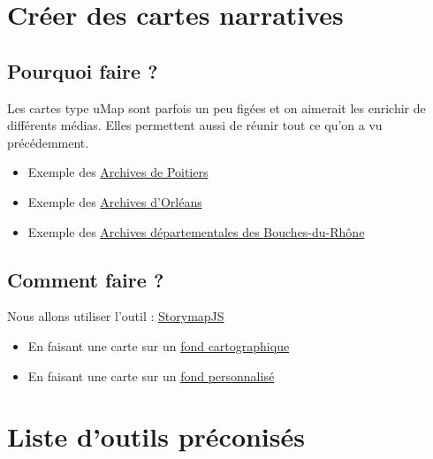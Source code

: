 \documentclass[
  letterpaper,
  DIV=11,
  numbers=noendperiod]{scrartcl}
\begin{document}
\section{Créer des cartes
narratives}\label{cruxe9er-des-cartes-narratives}

\subsection{Pourquoi faire ?}\label{pourquoi-faire-3}

Les cartes type uMap sont parfois un peu figées et on aimerait les
enrichir de différents médias. Elles permettent aussi de réunir tout ce
qu'on a vu précédemment.

\begin{itemize}
\item
  Exemple des
  \href{https://storymaps.arcgis.com/collections/9a11ba9ba4fa40389c188924aad51844?item=1}{Archives
  de Poitiers}
\item
  Exemple des
  \href{https://storymaps.arcgis.com/stories/e2cefbbcdb7d498289241459af733416}{Archives
  d'Orléans}
\item
  Exemple des
  \href{https://www.archives13.fr/n/l-exposition-coloniale-de-marseille-de/n:298}{Archives
  départementales des Bouches-du-Rhône}
\end{itemize}

\subsection{Comment faire ?}\label{comment-faire-4}

Nous allons utiliser l'outil :
\href{https://storymap.knightlab.com/}{StorymapJS}

\begin{itemize}
\item
  En faisant une carte sur un
  \href{https://uploads.knightlab.com/storymapjs/8afe734eb4caddd1798c4a5d80d649b2/marseille-205fi/index.html}{fond
  cartographique}
\item
  En faisant une carte sur un
  \href{https://uploads.knightlab.com/storymapjs/8afe734eb4caddd1798c4a5d80d649b2/port-de-brest/index.html}{fond
  personnalisé}
\end{itemize}

\section{Liste d'outils
préconisés}\label{liste-doutils-pruxe9conisuxe9s}
\end{document}
